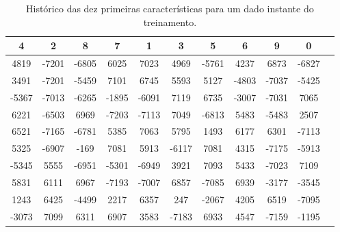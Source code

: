 \documentclass[conference]{IEEEtran}
\begin{document}
\begin{table}[h]
\caption{Histórico das dez primeiras características para um dado instante do treinamento.}
\tabcolsep=0.12cm
\begin{center}
\begin{tabular}{ccccccccccc}
\hline
4 & 2 & 8 & 7 & 1 & 3 & 5 & 6 & 9 & 0 \\ \hline
4819 & -7201 & -6805 & 6025 & 7023 & 4969 & -5761 & 4237 & 6873 & -6827 \\
3491 & -7201 & -5459 & 7101 & 6745 & 5593 & 5127 & -4803 & -7037 & -5425 \\
-5367 & -7013 & -6265 & -1895 & -6091 & 7119 & 6735 & -3007 & -7031 & 7065 \\
6221 & -6503 & 6969 & -7203 & -7113 & 7049 & -6813 & 5483 & -5483 & 2507 \\
6521 & -7165 & -6781 & 5385 & 7063 & 5795 & 1493 & 6177 & 6301 & -7113 \\
5325 & -6907 & -169 & 7081 & 5913 & -6117 & 7081 & 4315 & -7175 & -5913 \\
-5345 & 5555 & -6951 & -5301 & -6949 & 3921 & 7093 & 5433 & -7023 & 7109 \\
5831 & 6111 & 6967 & -7193 & -7007 & 6857 & -7085 & 6939 & -3177 & -3545 \\
1243 & 6425 & -4499 & 2217 & 6357 & 247 & -2067 & 4205 & 6519 & -7095 \\
-3073 & 7099 & 6311 & 6907 & 3583 & -7183 & 6933 & 4547 & -7159 & -1195 \\ \hline
\end{tabular}
\label{tabmem}
\end{center}
\end{table}
\end{document}
